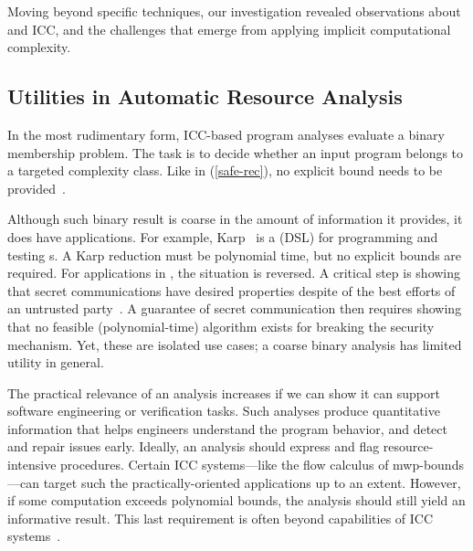 Moving beyond specific techniques, our investigation revealed observations about
 and ICC, and the challenges that emerge from
applying implicit computational complexity.

\subsection{Utilities in Automatic Resource Analysis}
\label{subsec:res-resource-analysis}

In the most rudimentary form, ICC-based program analyses evaluate a binary
membership problem. The task is to decide whether an input program belongs to a
targeted complexity class. Like in  (\autoref{safe-rec}), no explicit bound needs to be provided~\cite[p.
13]{moyen2017}.

Although such binary result is coarse in the amount of information it provides,
it does have applications. For example, Karp~\cite{zhang2022} is a
 (DSL) for programming and testing s. A Karp reduction must be polynomial time, but no explicit bounds
are required. For applications in , the situation is reversed.
A critical step is showing that secret communications have desired properties
despite of the best efforts of an untrusted party~\cite{rivest1990}. A guarantee
of secret communication then requires showing that no feasible (polynomial-time)
algorithm exists for breaking the security mechanism. Yet, these are isolated
use cases; a coarse binary analysis has limited utility in general.

The practical relevance of an analysis increases if we can show it can support
software engineering or verification tasks. Such analyses produce quantitative
information that helps engineers understand the program behavior, and detect and
repair issues early. Ideally, an analysis should express 
and flag resource-intensive procedures. Certain ICC systems---like the flow
calculus of mwp-bounds---can target such the practically-oriented applications
up to an extent. However, if some computation exceeds polynomial bounds, the
analysis should still yield an informative result. This last requirement is
often beyond capabilities of ICC systems~\cite{baillot2012}.

